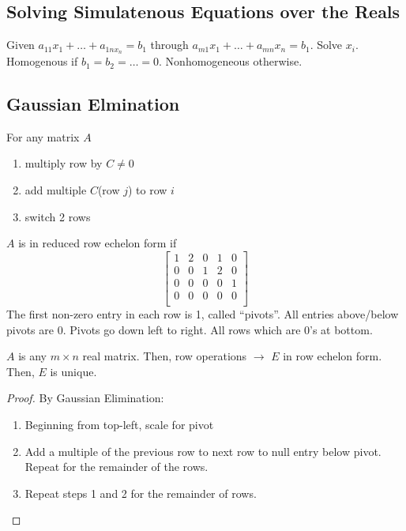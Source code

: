 \subsection{Solving Simulatenous Equations over the Reals}
Given $a_{11}x_1 + \hdots + a_{1nx_n} = b_1$ through $a_{m1}x_1 + \hdots + a_{mn}x_n = b_1$. Solve $x_i$. Homogenous if $b_1 = b_2 = \hdots = 0$. Nonhomogeneous otherwise.

\subsection{Gaussian Elmination}
For any matrix $A$
\begin{enumerate} 
	\item multiply row by $C\neq 0$
	\item add multiple $C$(row $j$) to row $i$
	\item switch 2 rows
\end{enumerate}

$A$ is in reduced row echelon form if 
\begin{equation}
	\begin{bmatrix} 
		1 &2 &0 &1 &0 \\
		0 &0 &1 &2 &0 \\
		0 &0 &0 &0 &1 \\
		0 &0 &0 &0 &0 \\
	\end{bmatrix}
\end{equation}
The first non-zero entry in each row is 1, called ``pivots''. All entries above/below pivots are 0. Pivots go down left to right. All rows which are 0's at bottom.


\begin{theorem} 
	$A$ is any $m\times n$ real matrix. Then, row operations $\rightarrow$ $E$ in row echelon form. Then, $E$ is unique.
\end{theorem}
\begin{proof}
By Gaussian Elimination:
\begin{enumerate} 
	\item Beginning from top-left, scale for pivot
	\item Add a multiple of the previous row to next row to null entry below pivot. Repeat for the remainder of the rows.
	\item Repeat steps 1 and 2 for the remainder of rows.
\end{enumerate}
\end{proof}

